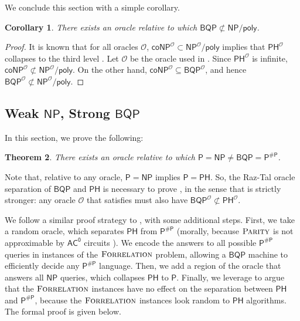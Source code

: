 \documentclass[11pt]{article}%
\newtheorem{theorem}{Theorem}
\newtheorem{corollary}[theorem]{Corollary}
\newcommand{\PARITY}{\normalfont\textsc{Parity}}
\newcommand{\Forrelation}{\normalfont\textsc{Forrelation}}
\begin{document}
We conclude this section with a simple corollary.

\begin{corollary}
\label{cor:bqp_not_in_np/poly}
There exists an oracle relative to which $\mathsf{BQP}\not \subset
\mathsf{NP/poly}$.
\end{corollary}

\begin{proof}
It is known that for all oracles $\mathcal{O}$, $\mathsf{coNP}^\mathcal{O}\subset\mathsf{NP}^\mathcal{O}/\mathsf{poly}$ implies that $\mathsf{PH}^\mathcal{O}$ collapses to the third level \cite{Yap83}. %
Let $\mathcal{O}$ be the oracle used in . Since $\mathsf{PH}^\mathcal{O}$ is infinite, $\mathsf{coNP}^\mathcal{O}\not\subset\mathsf{NP}^\mathcal{O}/\mathsf{poly}$. On the other hand, $\mathsf{coNP}^\mathcal{O}\subseteq\mathsf{BQP}^\mathcal{O}$, and hence $\mathsf{BQP}^\mathcal{O}\not\subset\mathsf{NP}^\mathcal{O}/\mathsf{poly}$.
\end{proof}

\subsection{Weak \texorpdfstring{$\mathsf{NP}$}{NP}, Strong \texorpdfstring{$\mathsf{BQP}$}{BQP}}

In this section, we prove the following:

\begin{theorem}
\label{thm:p=np_bqp=pp}
There exists an oracle relative to which $\mathsf{P}=\mathsf{NP}%
\neq\mathsf{BQP}=\mathsf{P}^{\mathsf{\#P}}$.
\end{theorem}

Note that, relative to any oracle, $\mathsf{P} = \mathsf{NP}$ implies $\mathsf{P} = \mathsf{PH}$. So, the Raz-Tal oracle separation of $\mathsf{BQP}$ and $\mathsf{PH}$ \cite{RT19} is necessary to prove , in the sense that  is strictly stronger: any oracle $\mathcal{O}$ that satisfies  must also have $\mathsf{BQP}^\mathcal{O} \not\subset \mathsf{PH}^\mathcal{O}$. 

We follow a similar proof strategy to , with some additional steps. First, we take a random oracle, which separates $\mathsf{PH}$ from $\mathsf{P}^\mathsf{\#P}$ (morally, because $\PARITY$ is not approximable by $\mathsf{AC^0}$ circuits \cite{Has87}). We encode the answers to all possible $\mathsf{P}^\mathsf{\# P}$ queries in instances of the $\Forrelation$ problem, allowing a $\mathsf{BQP}$ machine to efficiently decide any $\mathsf{P}^\mathsf{\# P}$ language. Then, we add a region of the oracle that answers all $\mathsf{NP}$ queries, which collapses $\mathsf{PH}$ to $\mathsf{P}$. Finally, we leverage  to argue that the $\Forrelation$ instances have no effect on the separation between $\mathsf{PH}$ and $\mathsf{P}^\mathsf{\#P}$, because the $\Forrelation$ instances look random to $\mathsf{PH}$ algorithms. The formal proof is given below.
\end{document}
